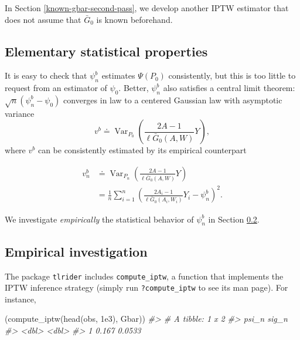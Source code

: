 \documentclass[
  11pt,
  openright,twoside]{book}
\newenvironment{Shaded}{\begin{snugshade}}{\end{snugshade}}
\newcommand{\CommentTok}[1]{\textcolor[rgb]{0.56,0.35,0.01}{\textit{#1}}}
\newcommand{\FloatTok}[1]{\textcolor[rgb]{0.00,0.00,0.81}{#1}}
\newcommand{\FunctionTok}[1]{\textcolor[rgb]{0.00,0.00,0.00}{#1}}
\newcommand{\NormalTok}[1]{#1}
\DeclareMathOperator{\Var}{Var}
\newcommand{\defq}{\doteq}
\newcommand{\Gbar}{\bar{G}}
\theoremstyle{definition}
\theoremstyle{definition}
\theoremstyle{definition}
\theoremstyle{definition}
\theoremstyle{remark}
\begin{document}
In Section \ref{known-gbar-second-pass}, we develop another IPTW estimator
that does not assume that \(\Gbar_{0}\) is known beforehand.

\hypertarget{elementary-statistical-properties}{%
\subsection{Elementary statistical properties}\label{elementary-statistical-properties}}

It is easy to check that \(\psi_{n}^{b}\) estimates \(\Psi(P_{0})\) consistently,
but this is too little to request from an estimator of \(\psi_{0}\). Better,
\(\psi_{n}^{b}\) also satisfies a central limit theorem: \(\sqrt{n} (\psi_{n}^{b} - \psi_{0})\) converges in law to a centered Gaussian law with
asymptotic variance \begin{equation*}v^{b}     \defq     \Var_{P_{0}}
\left(\frac{2A-1}{\ell\Gbar_{0}(A,W)}Y\right),\end{equation*} where \(v^{b}\)
can be consistently estimated by its empirical counterpart

\begin{align}
\label{eq:v-n-b}      v_{n}^{b}       &\defq      \Var_{P_{n}}
\left(\frac{2A-1}{\ell\Gbar_{0}(A,W)}Y\right) \\ 
&=        \frac{1}{n}        \sum_{i=1}^{n}\left(\frac{2A_{i}-1}{\ell\Gbar_{0}
(A_{i},W_{i})} Y_{i} - \psi_{n}^{b}\right)^{2}.
\end{align}

We investigate \emph{empirically} the statistical behavior of \(\psi_{n}^{b}\) in
Section \ref{empirical-inves-IPTW}.

\hypertarget{empirical-inves-IPTW}{%
\subsection{Empirical investigation}\label{empirical-inves-IPTW}}

The package \texttt{tlrider} includes \texttt{compute\_iptw}, a function that implements the
IPTW inference strategy (simply run \texttt{?compute\_iptw} to see its man page). For
instance,

\begin{Shaded}
\begin{Highlighting}[]
\NormalTok{(}\FunctionTok{compute\_iptw}\NormalTok{(}\FunctionTok{head}\NormalTok{(obs, }\FloatTok{1e3}\NormalTok{), Gbar))}
\CommentTok{\#\textgreater{} \# A tibble: 1 x 2}
\CommentTok{\#\textgreater{}   psi\_n  sig\_n}
\CommentTok{\#\textgreater{}   \textless{}dbl\textgreater{}  \textless{}dbl\textgreater{}}
\CommentTok{\#\textgreater{} 1 0.167 0.0533}
\end{Highlighting}
\end{Shaded}
\end{document}
